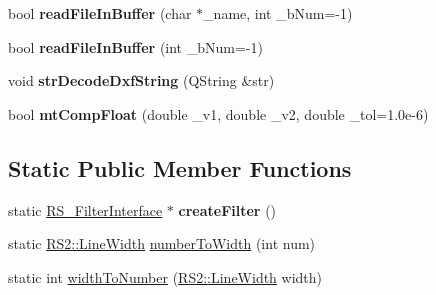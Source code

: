 \begin{DoxyCompactItemize}
\item 
\hypertarget{classRS__FilterDXF1_a85ef0e4322f8d168906cdf29deb1e927}{bool {\bfseries read\-File\-In\-Buffer} (char $\ast$\-\_\-name, int \-\_\-b\-Num=-\/1)}\label{classRS__FilterDXF1_a85ef0e4322f8d168906cdf29deb1e927}

\item 
\hypertarget{classRS__FilterDXF1_a0b02b1194945e7087677f42fb0609260}{bool {\bfseries read\-File\-In\-Buffer} (int \-\_\-b\-Num=-\/1)}\label{classRS__FilterDXF1_a0b02b1194945e7087677f42fb0609260}

\item 
\hypertarget{classRS__FilterDXF1_a15c4bd3c32a3ece4a6d7faa336974bf1}{void {\bfseries str\-Decode\-Dxf\-String} (Q\-String \&str)}\label{classRS__FilterDXF1_a15c4bd3c32a3ece4a6d7faa336974bf1}

\item 
\hypertarget{classRS__FilterDXF1_a6f5235b874cf45b6de0dfa334edb2533}{bool {\bfseries mt\-Comp\-Float} (double \-\_\-v1, double \-\_\-v2, double \-\_\-tol=1.\-0e-\/6)}\label{classRS__FilterDXF1_a6f5235b874cf45b6de0dfa334edb2533}

\end{DoxyCompactItemize}
\subsection*{Static Public Member Functions}
\begin{DoxyCompactItemize}
\item 
\hypertarget{classRS__FilterDXF1_a84f6bb14efc55056a66c473f2e98e74d}{static \hyperlink{classRS__FilterInterface}{R\-S\-\_\-\-Filter\-Interface} $\ast$ {\bfseries create\-Filter} ()}\label{classRS__FilterDXF1_a84f6bb14efc55056a66c473f2e98e74d}

\item 
static \hyperlink{classRS2_a023485c482c5ee9e36b3dfad781adf29}{R\-S2\-::\-Line\-Width} \hyperlink{classRS__FilterDXF1_a9686a0bd0fab3c71b0039d6940c25e44}{number\-To\-Width} (int num)
\item 
static int \hyperlink{classRS__FilterDXF1_a25a22fb5edafded7658fb0261ffadb6d}{width\-To\-Number} (\hyperlink{classRS2_a023485c482c5ee9e36b3dfad781adf29}{R\-S2\-::\-Line\-Width} width)
\end{DoxyCompactItemize}
